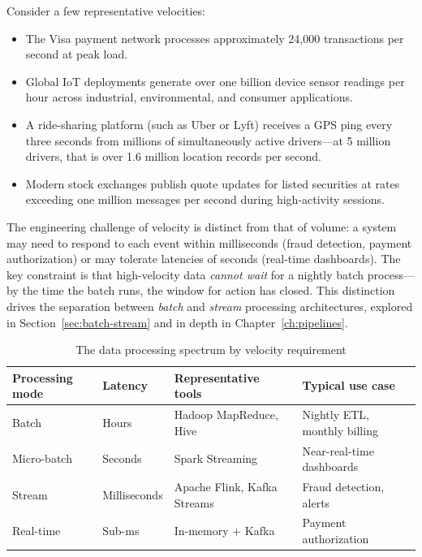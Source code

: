 Consider a few representative velocities:
\begin{itemize}
  \item The Visa payment network processes approximately 24,000
        transactions per second at peak load.
  \item Global IoT deployments generate over one billion device sensor
        readings per hour across industrial, environmental, and consumer
        applications.
  \item A ride-sharing platform (such as Uber or Lyft) receives a GPS
        ping every three seconds from millions of simultaneously active
        drivers---at 5 million drivers, that is over 1.6 million
        location records per second.
  \item Modern stock exchanges publish quote updates for listed
        securities at rates exceeding one million messages per second
        during high-activity sessions.
\end{itemize}

The engineering challenge of velocity is distinct from that of volume:
a system may need to respond to each event within milliseconds (fraud
detection, payment authorization) or may tolerate latencies of seconds
(real-time dashboards). The key constraint is that high-velocity data
\emph{cannot wait} for a nightly batch process---by the time the batch
runs, the window for action has closed. This distinction drives the
separation between \emph{batch} and \emph{stream} processing
architectures, explored in Section~\ref{sec:batch-stream} and in depth
in Chapter~\ref{ch:pipelines}.

\begin{table}[h!t]
\centering
\caption{The data processing spectrum by velocity requirement}
\label{tab:velocity-spectrum}
\renewcommand{\arraystretch}{1.35}
\begin{tabular}{L{2.2cm} L{2cm} L{3.2cm} L{3.4cm}}
\toprule
\textbf{Processing mode} & \textbf{Latency} & \textbf{Representative tools} & \textbf{Typical use case} \\
\midrule
Batch          & Hours      & Hadoop MapReduce, Hive & Nightly ETL, monthly billing \\
Micro-batch    & Seconds    & Spark Streaming        & Near-real-time dashboards \\
Stream         & Milliseconds & Apache Flink, Kafka Streams & Fraud detection, alerts \\
Real-time      & Sub-ms     & In-memory + Kafka      & Payment authorization \\
\bottomrule
\end{tabular}
\end{table}

